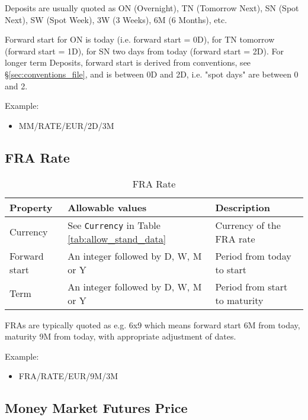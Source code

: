 Deposits are usually quoted as ON (Overnight), TN (Tomorrow Next), SN (Spot Next), SW (Spot Week), 3W (3 Weeks), 6M (6 Months), etc.
 
Forward start for ON is today (i.e. forward start = 0D), for TN tomorrow (forward start = 1D), for SN two days from today (forward start = 2D). For longer term Deposits, forward start is derived from conventions, see \S \ref{sec:conventions_file}, and is between 0D and 2D, i.e. "spot days" are between 0 and 2. 

\medskip
Example: 
\begin{itemize}
\item {MM/RATE/EUR/2D/3M}
\end{itemize}

\subsection{FRA Rate}

\begin{table}[H]
\centering
\begin{tabular}{|p{3cm}|p{3.5cm}|p{7cm}|}
\hline
{\bf Property} & {\bf Allowable values} & {\bf Description} \\
\hline
Currency & See \lstinline!Currency! in Table \ref{tab:allow_stand_data} & Currency of the FRA rate\\ \hline
Forward start & An integer followed by D, W, M or Y  & Period from today to start \\ \hline
Term & An integer followed by D, W, M or Y & Period from start to maturity\\ \hline
\end{tabular}
  \caption{FRA Rate}
  \label{tab:fra_quote}
\end{table}


FRAs are typically quoted as e.g. 6x9 which means forward start 6M from today, maturity 9M from today, with appropriate adjustment of dates.

\medskip
Example: 
\begin{itemize}
\item {FRA/RATE/EUR/9M/3M}
\end{itemize}

\subsection{Money Market Futures Price}

